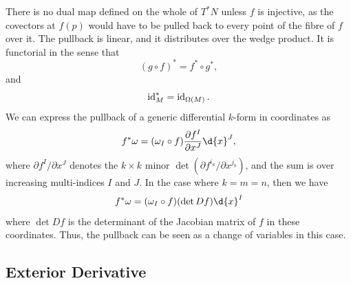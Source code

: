 \documentclass[a4paper,12pt]{article}
\begin{document}
There is no dual map defined on the whole of $T^*N$ unless $f$ is injective, as the covectors at $f(p)$ would have to be pulled back to every point of the fibre of $f$ over it.
The pullback is linear, and it distributes over the wedge product.
It is functorial in the sense that
\begin{equation}
    (g \circ f)^* = f^* \circ g^*,
\end{equation}
and
\begin{equation}
    \operatorname{id}^*_M = \operatorname{id}_{\Omega(M)}.
\end{equation}
We can express the pullback of a generic differential $k$-form in coordinates as
\begin{equation}
    f^*\omega = (\omega_I \circ f) \frac{\partial f^I}{\partial x^J} \d{x}^J,
\end{equation}
where $\partial f^I / \partial x^J$ denotes the $k \times k$ minor $\det(\partial f^{i_a}/\partial x^{j_b})$, and the sum is over increasing multi-indices $I$ and $J$.
In the case where $k = m = n$, then we have
\begin{equation}\label{eq:pullback_top-form_coordinates_formula}
    f^*\omega = (\omega_I \circ f) (\det Df) \d{x}^I
\end{equation}
where $\det Df$ is the determinant of the Jacobian matrix of $f$ in these coordinates.
Thus, the pullback can be seen as a change of variables in this case.

\subsection{Exterior Derivative}\label{subsec:differential_forms:exterior_derivative}
\end{document}
